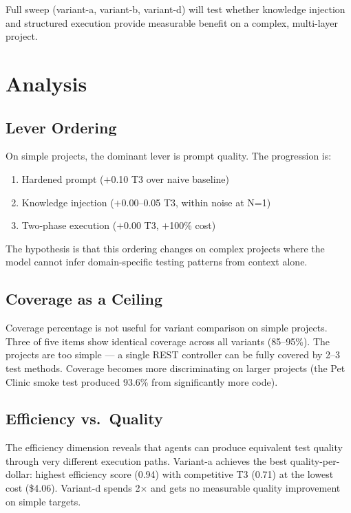 \documentclass[11pt,a4paper]{article}
\begin{document}
Full sweep (variant-a, variant-b, variant-d) will test whether knowledge injection
and structured execution provide measurable benefit on a complex, multi-layer project.

\section{Analysis}

\subsection{Lever Ordering}

On simple projects, the dominant lever is prompt quality. The progression is:
\begin{enumerate}
  \item Hardened prompt ($+$0.10 T3 over naive baseline)
  \item Knowledge injection ($+$0.00--0.05 T3, within noise at N=1)
  \item Two-phase execution ($+$0.00 T3, $+$100\% cost)
\end{enumerate}

The hypothesis is that this ordering changes on complex projects where the
model cannot infer domain-specific testing patterns from context alone.

\subsection{Coverage as a Ceiling}

Coverage percentage is not useful for variant comparison on simple projects.
Three of five items show identical coverage across all variants (85--95\%).
The projects are too simple --- a single REST controller can be fully covered
by 2--3 test methods. Coverage becomes more discriminating on larger projects
(the Pet Clinic smoke test produced 93.6\% from significantly more code).

\subsection{Efficiency vs.\ Quality}

The efficiency dimension reveals that agents can produce equivalent test quality
through very different execution paths. Variant-a achieves the best
quality-per-dollar: highest efficiency score (0.94) with competitive T3 (0.71)
at the lowest cost (\$4.06). Variant-d spends 2$\times$ and gets no measurable
quality improvement on simple targets.
\end{document}
